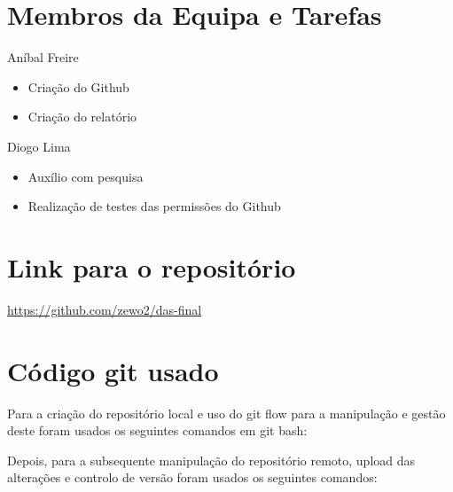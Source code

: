\documentclass[a4paper,12pt]{article}
\begin{document}
\section{Membros da Equipa e Tarefas}

Aníbal Freire
\begin{itemize}
    \item Criação do Github
    \item Criação do relatório
\end{itemize}
\vspace{0.2cm}

\noindent
Diogo Lima
\begin{itemize}
    \item Auxílio com pesquisa
    \item Realização de testes das permissões do Github
\end{itemize}
\vspace{0.2cm}

\newpage
\section{Link para o repositório}

\url{https://github.com/zewo2/das-final}

\section{Código git usado}

Para a criação do repositório local e uso do git flow para a manipulação e gestão deste foram usados os seguintes comandos em git bash:

\vspace{0.3cm}

\noindent{}

\vspace{0.3cm}

Depois, para a subsequente manipulação do repositório remoto, upload das alterações e controlo de versão foram usados os seguintes comandos:

\vspace{0.3cm}
\end{document}
